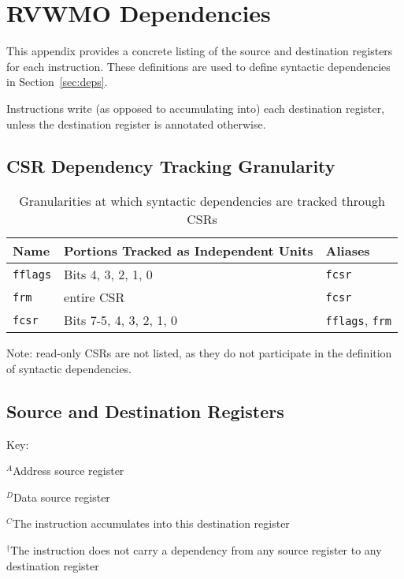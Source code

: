 \chapter{RVWMO Dependencies}
\label{ch:deps}
This appendix provides a concrete listing of the source and destination registers for each instruction.
These definitions are used to define syntactic dependencies in Section~\ref{sec:deps}.

Instructions write (as opposed to accumulating into) each destination register, unless the destination register is annotated otherwise.

\section{CSR Dependency Tracking Granularity}

\begin{table}[h!]
  \centering
  \begin{tabular}{|l|l|l|}
    \hline
    Name & Portions Tracked as Independent Units & Aliases \\
    \hline
    {\tt fflags} & Bits 4, 3, 2, 1, 0 & {\tt fcsr}  \\
    \hline
    {\tt frm} & entire CSR & {\tt fcsr} \\
    \hline
    {\tt fcsr} & Bits 7-5, 4, 3, 2, 1, 0 & {\tt fflags}, {\tt frm} \\
    \hline
  \end{tabular}
  \caption{Granularities at which syntactic dependencies are tracked through CSRs}
\end{table}

Note: read-only CSRs are not listed, as they do not participate in the definition of syntactic dependencies.

\section{Source and Destination Registers}

Key:

$^A$Address source register

$^D$Data source register

$^C$The instruction accumulates into this destination register

$^\dagger$The instruction does not carry a dependency from any source register to any destination register

